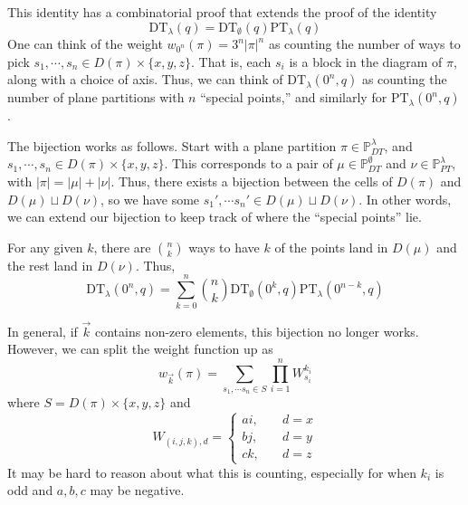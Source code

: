 \documentclass{amsart}
\newcommand{\PT}{\mathrm{PT}}
\newcommand{\DT}{\mathrm{DT}}
\newcommand{\PPT}[1]{\mathbb{P}^{#1}_{PT}}
\newcommand{\PDT}[1]{\mathbb{P}^{#1}_{DT}}
\begin{document}
This identity has a combinatorial proof that extends the proof of the
identity
\[
  \DT_\lambda(q) = \DT_\emptyset(q)\PT_\lambda(q)
\]
One can think of the weight $w_{0^n}(\pi) = 3^n|\pi|^n$ as counting
the number of ways to pick $s_1, \cdots, s_n \in D(\pi) \times
\{x,y,z\}$.  That is, each $s_i$ is a block in the diagram of $\pi$,
along with a choice of axis.  Thus, we can think of $\DT_\lambda(0^n,
q)$ as counting the number of plane partitions with $n$ ``special
points,'' and similarly for $\PT_\lambda(0^n, q)$.

The bijection works as follows.  Start with a plane partition
$\pi \in \PDT{\lambda}$, and
$s_1, \cdots, s_n \in D(\pi) \times \{x, y, z\}$.  This corresponds to
a pair of $\mu \in \PDT{\emptyset}$ and $\nu \in \PPT{\lambda}$, with
$|\pi| = |\mu| + |\nu|$.  Thus, there exists a bijection between the
cells of $D(\pi)$ and $D(\mu) \sqcup D(\nu)$, so we have some $s_1',
\cdots s_n' \in D(\mu) \sqcup D(\nu)$.  In other words, we can extend
our bijection to keep track of where the ``special points'' lie.

For any given $k$, there are $\binom{n}{k}$ ways to have $k$ of the
points land in $D(\mu)$ and the rest land in $D(\nu)$.  Thus,
\[
  \DT_\lambda(0^n, q) =
  \sum_{k = 0}^n \binom{n}{k}
  \DT_\emptyset(0^k, q)\PT_\lambda(0^{n-k}, q)
\]

In general, if $\vec k$ contains non-zero elements, this bijection no
longer works.  However, we can split the weight function up as
\[
  w_{\vec k}(\pi) = \sum_{s_1, \cdots s_n \in S} \prod_{i=1}^n
  W_{s_i}^{k_i}
\]
where $S = D(\pi) \times \{x, y, z\}$ and
\[
  W_{(i, j, k), d} = \begin{cases}
    ai, &\quad d = x \\
    bj, &\quad d = y \\
    ck, &\quad d = z
  \end{cases}
\]
It may be hard to reason about what this is counting, especially for
when $k_i$ is odd and $a, b, c$ may be negative.
\end{document}
